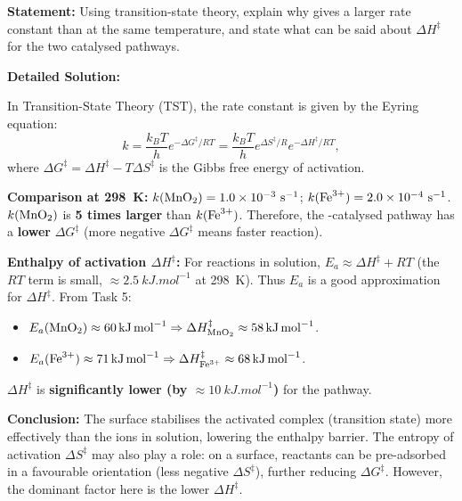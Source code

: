\documentclass[11pt]{article}
\begin{document}
\begin{exoresolu}
\textbf{Statement:} Using transition-state theory, explain why  gives a larger rate constant than  at the same temperature, and state what can be said about $\Delta H^{\ddagger}$ for the two catalysed pathways.

\tcblower
\textbf{Detailed Solution:}

In Transition-State Theory (TST), the rate constant is given by the Eyring equation:
\[
k = \frac{k_B T}{h} e^{-\Delta G^{\ddagger}/RT} = \frac{k_B T}{h} e^{\Delta S^{\ddagger}/R} e^{-\Delta H^{\ddagger}/RT},
\]
where $\Delta G^{\ddagger} = \Delta H^{\ddagger} - T\Delta S^{\ddagger}$ is the Gibbs free energy of activation.

\textbf{Comparison at \SI{298}{K}:}
$k(\ce{MnO2}) = 1.0 \times 10^{-3}\ \si{s^{-1}}$; $k(\ce{Fe^{3+}}) = 2.0 \times 10^{-4}\ \si{s^{-1}}$.
$k(\ce{MnO2})$ is \textbf{5 times larger} than $k(\ce{Fe^{3+}})$. Therefore, the -catalysed pathway has a \textbf{lower} $\Delta G^{\ddagger}$ (more negative $\Delta G^{\ddagger}$ means faster reaction).

\textbf{Enthalpy of activation $\Delta H^{\ddagger}$:}
For reactions in solution, $E_a \approx \Delta H^{\ddagger} + RT$ (the $RT$ term is small, $\approx \SI{2.5}{kJ.mol^{-1}}$ at \SI{298}{K}). Thus $E_a$ is a good approximation for $\Delta H^{\ddagger}$.
From Task 5:
\begin{itemize}
    \item $E_a(\ce{MnO2}) \approx \SI{60}{kJ.mol^{-1}} \Rightarrow \Delta H^{\ddagger}_{\ce{MnO2}} \approx \SI{58}{kJ.mol^{-1}}$.
    \item $E_a(\ce{Fe^{3+}}) \approx \SI{71}{kJ.mol^{-1}} \Rightarrow \Delta H^{\ddagger}_{\ce{Fe^{3+}}} \approx \SI{68}{kJ.mol^{-1}}$.
\end{itemize}
$\Delta H^{\ddagger}$ is \textbf{significantly lower (by $\approx \SI{10}{kJ.mol^{-1}}$)} for the  pathway.

\textbf{Conclusion:} The  surface stabilises the activated complex (transition state) more effectively than the  ions in solution, lowering the enthalpy barrier. The entropy of activation $\Delta S^{\ddagger}$ may also play a role: on a surface, reactants can be pre-adsorbed in a favourable orientation (less negative $\Delta S^{\ddagger}$), further reducing $\Delta G^{\ddagger}$. However, the dominant factor here is the lower $\Delta H^{\ddagger}$.
\end{exoresolu}
\end{document}

